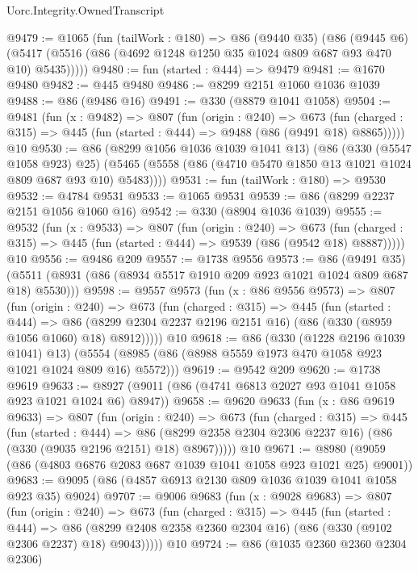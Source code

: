 \begin{lexlean}{Uorc.Integrity.OwnedTranscript}
\begin{coremodule}
@9479 := @1065
    (fun (tailWork : @180) =>
    @86
      (@9440 @35)
      (@86
        (@9445 @6)
        (@5417 (@5516 (@86 (@4692 @1248 @1250 @35 @1024 @809 @687 @93 @470 @10) @5435)))))
@9480 := fun (started : @444) => @9479
@9481 := @1670 @9480
@9482 := @445 @9480
@9486 := @8299 @2151 @1060 @1036 @1039
@9488 := @86 (@9486 @16)
@9491 := @330 (@8879 @1041 @1058)
@9504 := @9481
    (fun (x : @9482) =>
    @807
      (fun (origin : @240) =>
      @673 (fun (charged : @315) => @445 (fun (started : @444) => @9488 (@86 (@9491 @18) @8865)))))
    @10
@9530 := @86
    (@8299 @1056 @1036 @1039 @1041 @13)
    (@86
      (@330 (@5547 @1058 @923) @25)
      (@5465 (@5558 (@86 (@4710 @5470 @1850 @13 @1021 @1024 @809 @687 @93 @10) @5483))))
@9531 := fun (tailWork : @180) => @9530
@9532 := @4784 @9531
@9533 := @1065 @9531
@9539 := @86 (@8299 @2237 @2151 @1056 @1060 @16)
@9542 := @330 (@8904 @1036 @1039)
@9555 := @9532
    (fun (x : @9533) =>
    @807
      (fun (origin : @240) =>
      @673 (fun (charged : @315) => @445 (fun (started : @444) => @9539 (@86 (@9542 @18) @8887)))))
    @10
@9556 := @9486 @209
@9557 := @1738 @9556
@9573 := @86
    (@9491 @35)
    (@5511 (@8931 (@86 (@8934 @5517 @1910 @209 @923 @1021 @1024 @809 @687 @18) @5530)))
@9598 := @9557
    @9573
    (fun (x : @86 @9556 @9573) =>
    @807
      (fun (origin : @240) =>
      @673
        (fun (charged : @315) =>
        @445
          (fun (started : @444) =>
          @86 (@8299 @2304 @2237 @2196 @2151 @16) (@86 (@330 (@8959 @1056 @1060) @18) @8912)))))
    @10
@9618 := @86
    (@330 (@1228 @2196 @1039 @1041) @13)
    (@5554 (@8985 (@86 (@8988 @5559 @1973 @470 @1058 @923 @1021 @1024 @809 @16) @5572)))
@9619 := @9542 @209
@9620 := @1738 @9619
@9633 := @8927 (@9011 (@86 (@4741 @6813 @2027 @93 @1041 @1058 @923 @1021 @1024 @6) @8947))
@9658 := @9620
    @9633
    (fun (x : @86 @9619 @9633) =>
    @807
      (fun (origin : @240) =>
      @673
        (fun (charged : @315) =>
        @445
          (fun (started : @444) =>
          @86 (@8299 @2358 @2304 @2306 @2237 @16) (@86 (@330 (@9035 @2196 @2151) @18) @8967)))))
    @10
@9671 := @8980 (@9059 (@86 (@4803 @6876 @2083 @687 @1039 @1041 @1058 @923 @1021 @25) @9001))
@9683 := @9095 (@86 (@4857 @6913 @2130 @809 @1036 @1039 @1041 @1058 @923 @35) @9024)
@9707 := @9006
    @9683
    (fun (x : @9028 @9683) =>
    @807
      (fun (origin : @240) =>
      @673
        (fun (charged : @315) =>
        @445
          (fun (started : @444) =>
          @86 (@8299 @2408 @2358 @2360 @2304 @16) (@86 (@330 (@9102 @2306 @2237) @18) @9043)))))
    @10
@9724 := @86
    (@1035 @2360 @2360 @2304 @2306)

\end{coremodule}
\end{lexlean}
